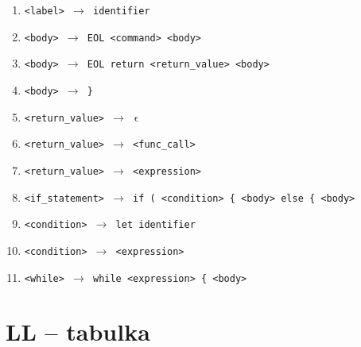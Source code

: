 \documentclass[a4paper, 11pt]{article}
\begin{document}
{\begin{enumerate}[noitemsep]
		\item \texttt{<label>  $\rightarrow$ identifier}
		\item \texttt{<body>  $\rightarrow$ EOL <command> <body>}
		\item \texttt{<body>  $\rightarrow$ EOL return <return\_value> <body>}
		\item \texttt{<body>  $\rightarrow$ \}}
		\item \texttt{<return\_value>  $\rightarrow\,\,\upvarepsilon$}
		\item \texttt{<return\_value>  $\rightarrow$ <func\_call>}
		\item \texttt{<return\_value>  $\rightarrow$ <expression>}
		\item \texttt{<if\_statement>  $\rightarrow$ if ( <condition>  \{ <body> else \{ <body>}
		\item \texttt{<condition> $\rightarrow$ let identifier}
		\item \texttt{<condition> $\rightarrow$ <expression>}
		\item \texttt{<while> $\rightarrow$ while <expression> \{ <body>}
		
	\end{enumerate}
	}

	\newpage
	\section*{LL -- tabulka}
	
\end{document}
